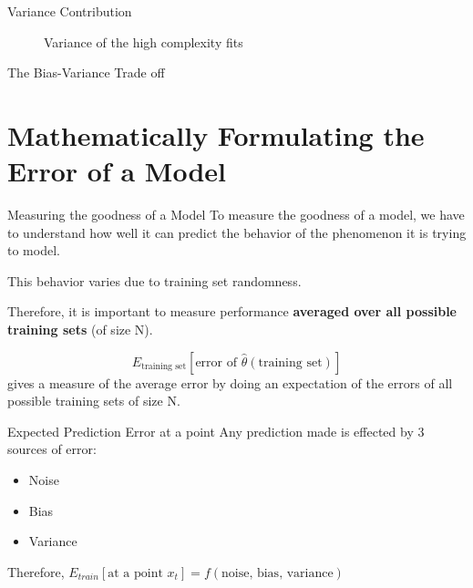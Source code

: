 \documentclass{beamer}
\begin{document}
\begin{frame}{Variance Contribution}
{\begin{figure}
\vspace*{-0.3cm}
\caption{Variance of the high complexity fits}
\end{figure}}

\end{frame}

\begin{frame}{The Bias-Variance Trade off}
\end{frame}

\section{Mathematically Formulating the Error of a Model}

\begin{frame}{Measuring the goodness of a Model}
To measure the goodness of a model, we have to understand how well it can predict the behavior of the phenomenon it is trying to model.
\pause

This behavior varies due to training set randomness.
\pause 

Therefore, it is important to measure performance \textbf{averaged over all possible training sets} (of size N). 
\pause

$$E_{\text{training set}}[\text{error of } \hat\theta(\text{training set})] $$
gives a measure of the average error by doing an expectation of the errors of all possible training sets of size N.
\end{frame}

\begin{frame}{Expected Prediction Error at a point}
Any prediction made is effected by 3 sources of error:
\begin{itemize}
\item Noise
\item Bias
\item Variance
\end{itemize}
\pause

Therefore, $E_{train}[\text{at a point } x_t] = f(\text{noise, bias, variance}) $ 

\end{frame}
\end{document}
